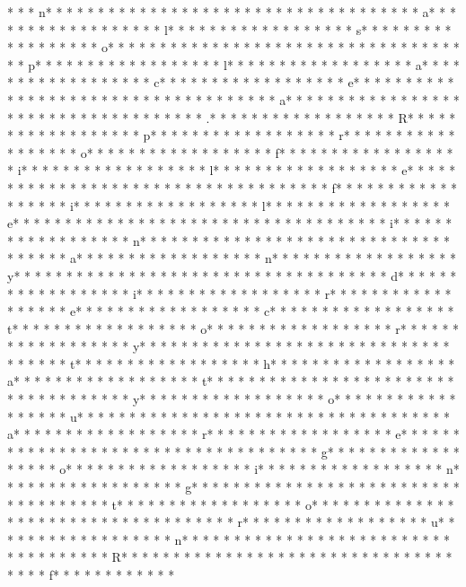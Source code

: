 * *  * n* * *  * * *  * * *  *  * * *  *  * * *  *  * * *  * * *  * * *  *  * * *  *  * * *  * a* * *  * * *  * * *  *  * * *  *  * * *  * l* * *  * * *  * * *  *  * * *  *  * * *  * s* * *  * * *  * * *  *  * * *  *  * * *  * o* * *  * * *  * * *  *  * * *  *  * * *  *  * * *  * * *  * * *  *  * * *  *  * * *  * p* * *  * * *  * * *  *  * * *  *  * * *  * l* * *  * * *  * * *  *  * * *  *  * * *  * a* * *  * * *  * * *  *  * * *  *  * * *  * c* * *  * * *  * * *  *  * * *  *  * * *  * e* * *  * * *  * * *  *  * * *  *  * * *  *  * * *  * * *  * * *  *  * * *  *  * * *  * a* * *  * * *  * * *  *  * * *  *  * * *  *  * * *  * * *  * * *  *  * * *  *  * * *  * .* * *  * * *  * * *  *  * * *  *  * * *  * R* * *  * * *  * * *  *  * * *  *  * * *  * p* * *  * * *  * * *  *  * * *  *  * * *  * r* * *  * * *  * * *  *  * * *  *  * * *  * o* * *  * * *  * * *  *  * * *  *  * * *  * f* * *  * * *  * * *  *  * * *  *  * * *  * i* * *  * * *  * * *  *  * * *  *  * * *  * l* * *  * * *  * * *  *  * * *  *  * * *  * e* * *  * * *  * * *  *  * * *  *  * * *  *  * * *  * * *  * * *  *  * * *  *  * * *  * f* * *  * * *  * * *  *  * * *  *  * * *  * i* * *  * * *  * * *  *  * * *  *  * * *  * l* * *  * * *  * * *  *  * * *  *  * * *  * e* * *  * * *  * * *  *  * * *  *  * * *  *  * * *  * * *  * * *  *  * * *  *  * * *  * i* * *  * * *  * * *  *  * * *  *  * * *  * n* * *  * * *  * * *  *  * * *  *  * * *  *  * * *  * * *  * * *  *  * * *  *  * * *  * a* * *  * * *  * * *  *  * * *  *  * * *  * n* * *  * * *  * * *  *  * * *  *  * * *  * y* * *  * * *  * * *  *  * * *  *  * * *  *  * * *  * * *  * * *  *  * * *  *  * * *  * d* * *  * * *  * * *  *  * * *  *  * * *  * i* * *  * * *  * * *  *  * * *  *  * * *  * r* * *  * * *  * * *  *  * * *  *  * * *  * e* * *  * * *  * * *  *  * * *  *  * * *  * c* * *  * * *  * * *  *  * * *  *  * * *  * t* * *  * * *  * * *  *  * * *  *  * * *  * o* * *  * * *  * * *  *  * * *  *  * * *  * r* * *  * * *  * * *  *  * * *  *  * * *  * y* * *  * * *  * * *  *  * * *  *  * * *  *  * * *  * * *  * * *  *  * * *  *  * * *  * t* * *  * * *  * * *  *  * * *  *  * * *  * h* * *  * * *  * * *  *  * * *  *  * * *  * a* * *  * * *  * * *  *  * * *  *  * * *  * t* * *  * * *  * * *  *  * * *  *  * * *  *  * * *  * * *  * * *  *  * * *  *  * * *  * y* * *  * * *  * * *  *  * * *  *  * * *  * o* * *  * * *  * * *  *  * * *  *  * * *  * u* * *  * * *  * * *  *  * * *  *  * * *  *  * * *  * * *  * * *  *  * * *  *  * * *  * a* * *  * * *  * * *  *  * * *  *  * * *  * r* * *  * * *  * * *  *  * * *  *  * * *  * e* * *  * * *  * * *  *  * * *  *  * * *  *  * * *  * * *  * * *  *  * * *  *  * * *  * g* * *  * * *  * * *  *  * * *  *  * * *  * o* * *  * * *  * * *  *  * * *  *  * * *  * i* * *  * * *  * * *  *  * * *  *  * * *  * n* * *  * * *  * * *  *  * * *  *  * * *  * g* * *  * * *  * * *  *  * * *  *  * * *  *  * * *  * * *  * * *  *  * * *  *  * * *  * t* * *  * * *  * * *  *  * * *  *  * * *  * o* * *  * * *  * * *  *  * * *  *  * * *  *  * * *  * * *  * * *  *  * * *  *  * * *  * r* * *  * * *  * * *  *  * * *  *  * * *  * u* * *  * * *  * * *  *  * * *  *  * * *  * n* * *  * * *  * * *  *  * * *  *  * * *  *  * * *  * * *  * * *  *  * * *  *  * * *  * R* * *  * * *  * * *  *  * * *  *  * * *  *  * * *  * * *  * * *  *  * * *  *  * * *  * f* * *  * * *  * * *  *  * * 
